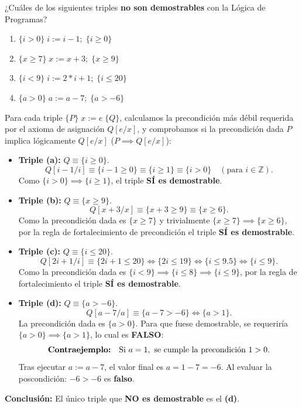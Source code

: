 \begin{ejercicio}
¿Cuáles de los siguientes triples \textbf{no son demostrables} con la Lógica de Programas?
\begin{enumerate}[label=(\alph*),leftmargin=*]
    \item $\{i > 0\} \; i := i - 1; \; \{i \ge 0\}$
    \item $\{x \ge 7\} \; x := x + 3; \; \{x \ge 9\}$
    \item $\{i < 9\} \; i := 2 * i + 1; \; \{i \le 20\}$
    \item $\{a > 0\} \; a := a - 7; \; \{a > -6\}$
\end{enumerate}
\end{ejercicio}

\begin{solucion}
Para cada triple $\{P\} \; x := e \; \{Q\}$, calculamos la precondición más débil requerida por el axioma de asignación $Q[e/x]$, y comprobamos si la precondición dada $P$ implica lógicamente $Q[e/x]$ ($P \implies Q[e/x]$):

\begin{itemize}[leftmargin=*]
    \item \textbf{Triple (a):} $Q \equiv \{i \ge 0\}$.
    \[
    Q[i - 1 / i] \equiv \{i - 1 \ge 0\} \equiv \{i \ge 1\} \equiv \{i > 0\} \quad (\text{para } i \in \mathbb{Z}).
    \]
    Como $\{i > 0\} \implies \{i \ge 1\}$, el triple \textbf{SÍ es demostrable}.

    \item \textbf{Triple (b):} $Q \equiv \{x \ge 9\}$.
    \[
    Q[x + 3 / x] \equiv \{x + 3 \ge 9\} \equiv \{x \ge 6\}.
    \]
    Como la precondición dada es $\{x \ge 7\}$ y trivialmente $\{x \ge 7\} \implies \{x \ge 6\}$, por la regla de fortalecimiento de precondición el triple \textbf{SÍ es demostrable}.

    \item \textbf{Triple (c):} $Q \equiv \{i \le 20\}$.
    \[
    Q[2i + 1 / i] \equiv \{2i + 1 \le 20\} \iff \{2i \le 19\} \iff \{i \le 9.5\} \iff \{i \le 9\}.
    \]
    Como la precondición dada es $\{i < 9\} \implies \{i \le 8\} \implies \{i \le 9\}$, por la regla de fortalecimiento el triple \textbf{SÍ es demostrable}.

    \item \textbf{Triple (d):} $Q \equiv \{a > -6\}$.
    \[
    Q[a - 7 / a] \equiv \{a - 7 > -6\} \iff \{a > 1\}.
    \]
    La precondición dada es $\{a > 0\}$. Para que fuese demostrable, se requeriría $\{a > 0\} \implies \{a > 1\}$, lo cual es \textbf{FALSO}:
    \[
    \text{\textbf{Contraejemplo:}} \quad \text{Si } a = 1, \text{ se cumple la precondición } 1 > 0.
    \]
    Tras ejecutar $a := a - 7$, el valor final es $a = 1 - 7 = -6$. Al evaluar la poscondición: $-6 > -6$ es \textbf{falso}.
\end{itemize}

\textbf{Conclusión:} El único triple que \textbf{NO es demostrable} es el \textbf{(d)}.
\end{solucion}

